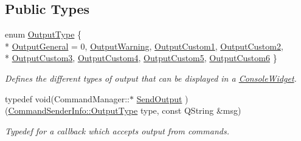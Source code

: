 \subsection*{Public Types}
\begin{DoxyCompactItemize}
\item 
enum \hyperlink{class_command_sender_info_a3a5e6a2ef1772f6557f351652c2e3b60}{Output\-Type} \{ \\*
\hyperlink{class_command_sender_info_a3a5e6a2ef1772f6557f351652c2e3b60a64260c3ff17cea2a0f40e2ed74725f2b}{Output\-General} = 0, 
\hyperlink{class_command_sender_info_a3a5e6a2ef1772f6557f351652c2e3b60a1f1c1e463dbcd5c68f875391a024f520}{Output\-Warning}, 
\hyperlink{class_command_sender_info_a3a5e6a2ef1772f6557f351652c2e3b60a706c899cbfdfa13ffdad7083e52c3fed}{Output\-Custom1}, 
\hyperlink{class_command_sender_info_a3a5e6a2ef1772f6557f351652c2e3b60a2226af7b44b642ccaa3d276171a5e83c}{Output\-Custom2}, 
\\*
\hyperlink{class_command_sender_info_a3a5e6a2ef1772f6557f351652c2e3b60ab3580e2a4b7ce9cd6ceccf36ae3fa852}{Output\-Custom3}, 
\hyperlink{class_command_sender_info_a3a5e6a2ef1772f6557f351652c2e3b60a23562ae85b8c4b677f80813d4a51fdbb}{Output\-Custom4}, 
\hyperlink{class_command_sender_info_a3a5e6a2ef1772f6557f351652c2e3b60a800acfe2330488652d04da3d82474242}{Output\-Custom5}, 
\hyperlink{class_command_sender_info_a3a5e6a2ef1772f6557f351652c2e3b60a60ad31618b524d4c8ce1751cff398133}{Output\-Custom6}
 \}
\begin{DoxyCompactList}\small\item\em Defines the different types of output that can be displayed in a \hyperlink{class_console_widget}{Console\-Widget}. \end{DoxyCompactList}\item 
typedef void(Command\-Manager\-::$\ast$ \hyperlink{class_command_sender_info_a68c494ef69a25ac7bf667b83e24639ed}{Send\-Output} )(\hyperlink{class_command_sender_info_a3a5e6a2ef1772f6557f351652c2e3b60}{Command\-Sender\-Info\-::\-Output\-Type} type, const Q\-String \&msg)
\begin{DoxyCompactList}\small\item\em Typedef for a callback which accepts output from commands. \end{DoxyCompactList}\end{DoxyCompactItemize}
